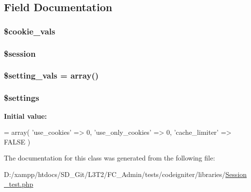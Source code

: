 \subsection{Field Documentation}
\hypertarget{class_session__test_a36ea48aaa06330d182a738b99354865a}{}
\subsubsection[{\$cookie\+\_\+vals}]{\setlength{\rightskip}{0pt plus 5cm}\$cookie\+\_\+vals\hspace{0.3cm}{\ttfamily [protected]}}\label{class_session__test_a36ea48aaa06330d182a738b99354865a}
\hypertarget{class_session__test_abefb3c26429d514777313e9a63d7cbac}{}
\subsubsection[{\$session}]{\setlength{\rightskip}{0pt plus 5cm}\$session\hspace{0.3cm}{\ttfamily [protected]}}\label{class_session__test_abefb3c26429d514777313e9a63d7cbac}
\hypertarget{class_session__test_abe91b52072ee4aae659bc203caad5e20}{}
\subsubsection[{\$setting\+\_\+vals}]{\setlength{\rightskip}{0pt plus 5cm}\$setting\+\_\+vals = array()\hspace{0.3cm}{\ttfamily [protected]}}\label{class_session__test_abe91b52072ee4aae659bc203caad5e20}
\hypertarget{class_session__test_ac7c3353107070daa85f641882931b358}{}
\subsubsection[{\$settings}]{\setlength{\rightskip}{0pt plus 5cm}\$settings\hspace{0.3cm}{\ttfamily [protected]}}\label{class_session__test_ac7c3353107070daa85f641882931b358}
{\bfseries Initial value\+:}
\begin{DoxyCode}
= array(
        \textcolor{stringliteral}{'use\_cookies'} => 0,
        \textcolor{stringliteral}{'use\_only\_cookies'} => 0,
        \textcolor{stringliteral}{'cache\_limiter'} => FALSE
    )
\end{DoxyCode}


The documentation for this class was generated from the following file\+:\begin{DoxyCompactItemize}
\item 
D\+:/xampp/htdocs/\+S\+D\+\_\+\+Git/\+L3\+T2/\+F\+C\+\_\+\+Admin/tests/codeigniter/libraries/\hyperlink{_session__test_8php}{Session\+\_\+test.\+php}\end{DoxyCompactItemize}
